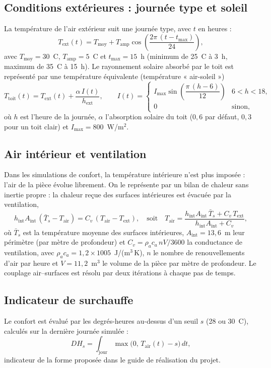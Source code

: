 \subsection{Conditions extérieures : journée type et soleil}
La température de l'air extérieur suit une journée type, avec $t$ en heures :
\begin{equation}\label{eq:text}
T_{\mathrm{ext}}(t)=T_{\mathrm{moy}}+T_{\mathrm{amp}}\cos\!\left(\frac{2\pi\,(t-t_{\max})}{24}\right),
\end{equation}
avec $T_{\mathrm{moy}}=30$~\textdegree C, $T_{\mathrm{amp}}=5$~\textdegree C et $t_{\max}=15$~h
(minimum de 25~\textdegree C à 3~h, maximum de 35~\textdegree C à 15~h).
Le rayonnement solaire absorbé par le toit est représenté par une température équivalente (température
« air-soleil »)
\begin{equation}\label{eq:airsoleil}
T_{\mathrm{toit}}(t)=T_{\mathrm{ext}}(t)+\frac{\alpha\,I(t)}{h_{\mathrm{ext}}},\qquad
I(t)=\begin{cases}I_{\max}\sin\!\left(\dfrac{\pi\,(h-6)}{12}\right)&6<h<18,\\[0.5em]0&\text{sinon,}\end{cases}
\end{equation}
où $h$ est l'heure de la journée, $\alpha$ l'absorption solaire du toit ($0{,}6$ par défaut,
$0{,}3$ pour un toit clair) et $I_{\max}=800$~W/m$^2$.

\subsection{Air intérieur et ventilation}
Dans les simulations de confort, la température intérieure n'est plus imposée : l'air de la pièce évolue
librement. On le représente par un bilan de chaleur sans inertie propre : la chaleur reçue des surfaces
intérieures est évacuée par la ventilation,
\begin{equation}\label{eq:air}
h_{\mathrm{int}}A_{\mathrm{int}}\,(\bar T_s-T_{\mathrm{air}})=C_v\,(T_{\mathrm{air}}-T_{\mathrm{ext}}),
\quad\text{soit}\quad
T_{\mathrm{air}}=\frac{h_{\mathrm{int}}A_{\mathrm{int}}\,\bar T_s+C_v\,T_{\mathrm{ext}}}{h_{\mathrm{int}}A_{\mathrm{int}}+C_v},
\end{equation}
où $\bar T_s$ est la température moyenne des surfaces intérieures, $A_{\mathrm{int}}=13{,}6$~m leur périmètre
(par mètre de profondeur) et $C_v=\rho_a c_a\,nV/3600$ la conductance de ventilation, avec
$\rho_a c_a=1{,}2\times 1005$~J/(m$^3$\,K), $n$ le nombre de renouvellements d'air par heure et
$V=11{,}2$~m$^3$ le volume de la pièce par mètre de profondeur. Le couplage air--surfaces est résolu par
deux itérations à chaque pas de temps.

\subsection{Indicateur de surchauffe}
Le confort est évalué par les degrés-heures au-dessus d'un seuil $s$ (28 ou 30~\textdegree C), calculés
sur la dernière journée simulée :
\begin{equation}\label{eq:dh}
DH_s=\int_{\text{jour}}\max\bigl(0,\,T_{\mathrm{air}}(t)-s\bigr)\,dt ,
\end{equation}
indicateur de la forme proposée dans le guide de réalisation du projet.
